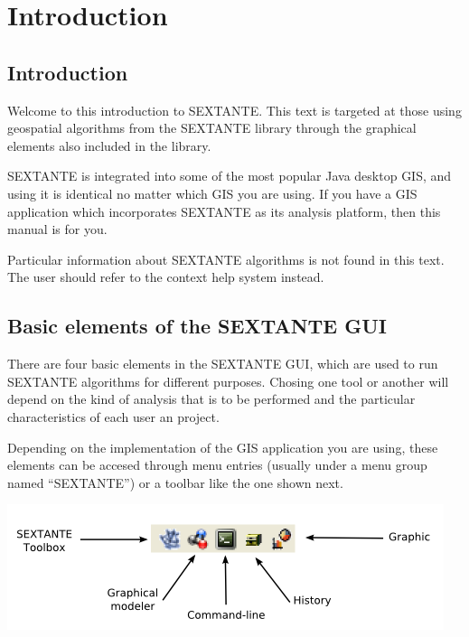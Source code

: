 \chapter{Introduction}

\section{Introduction}

Welcome to this introduction to SEXTANTE. This text is targeted at those using geospatial algorithms from the SEXTANTE library through the graphical elements also included in the library.

SEXTANTE is integrated into some of the most popular Java desktop GIS, and using it is identical no matter which GIS you are using. If you have a GIS application which incorporates SEXTANTE as its analysis platform, then this manual is for you.

Particular information about SEXTANTE algorithms is not found in this text. The user should refer to the context help system instead.


\section{Basic elements of the SEXTANTE GUI}

There are four basic elements in the SEXTANTE GUI, which are used to run SEXTANTE algorithms for different purposes. Chosing one tool or another will depend on the kind of analysis that is to be performed and the particular characteristics of each user an project.

Depending on the implementation of the GIS application you are using, these elements can be accesed through menu entries (usually under a menu group named ``SEXTANTE'') or a toolbar like the one shown next.

\begin{center}
\includegraphics[width=.5\columnwidth]{sextante_objects.png}
\end{center}

